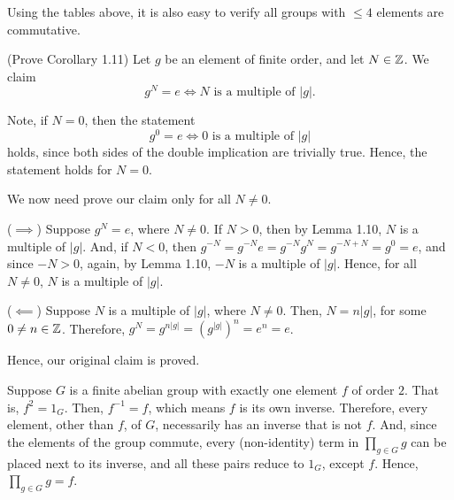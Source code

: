 \begin{xca}
Using the tables above, it is also easy to verify all groups with $\le 4$
elements are commutative.
\end{xca}

\begin{xca}
(Prove Corollary 1.11) Let $g$ be an element of finite order, and let $N \in
\mathbb{Z}$. We claim
\[ g^N = e \iff N \text{ is a multiple of } |g|. \]

Note, if $N = 0$, then the statement
\[ g^0 = e \iff 0 \text{ is a multiple of } |g| \]
holds, since both sides of the double implication are trivially true. Hence,
the statement holds for $N = 0$.

We now need prove our claim only for all $N \ne 0$.

($\implies$) Suppose $g^N = e$, where $N \ne 0$. If $N > 0$, then by Lemma 1.10,
$N$ is a multiple of $|g|$. And, if $N < 0$, then $g^{-N} = g^{-N} e = g^{-N}
g^N = g^{-N + N} = g^0 = e$, and since $-N > 0$, again, by Lemma 1.10, $-N$ is
a multiple of $|g|$. Hence, for all $N \ne 0$, $N$ is a multiple of $|g|$.

($\impliedby$) Suppose $N$ is a multiple of $|g|$, where $N \ne 0$. Then, $N =
n |g|$, for some $0 \ne n \in \mathbb{Z}$. Therefore, $g^N = g^{n|g|} = (g^{|g|})^n =
e^n = e$.

Hence, our original claim is proved.
\end{xca}

\begin{xca}
Suppose $G$ is a finite abelian group with exactly one element $f$ of order $2$.
That is, $f^2 = 1_G$. Then, $f^{-1} = f$, which means $f$ is its own inverse.
Therefore, every element, other than $f$, of $G$, necessarily has an inverse
that is not $f$. And, since the elements of the group commute, every
(non-identity) term in $\prod_{g \in G} g$ can be placed next to its inverse,
and all these pairs reduce to $1_G$, except $f$. Hence, $\prod_{g \in G} g =
f$.
\end{xca}

